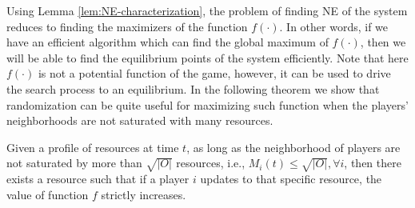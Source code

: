 \smallskip
Using Lemma \ref{lem:NE-characterization}, the problem of finding NE of the system reduces to finding the maximizers of the function $f(\cdot)$. In other words, if we have an efficient algorithm which can find the global maximum of $f(\cdot)$, then we will be able to find the equilibrium points of the system efficiently. Note that here $f(\cdot)$ is not a potential function of the game, however, it can be used to drive the search process to an equilibrium. In the following theorem we show that randomization can be quite useful for maximizing such function when the players' neighborhoods are not saturated with many resources.

\smallskip
\begin{theorem}\label{thm:randomization}
Given a profile of resources at time $t$, as long as the neighborhood of players are not saturated by more than $\sqrt{|O|}$ resources, i.e., $M_i(t)\leq \sqrt{|O|}, \forall i$, then there exists a resource such that if a player $i$ updates to that specific resource, the value of function $f$ strictly increases.
\end{theorem}
